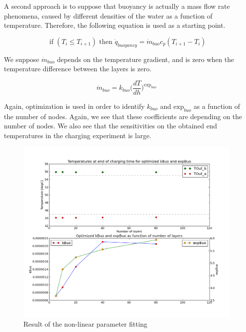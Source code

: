 A second approach is to suppose that buoyancy is actually a mass flow rate phenomena, caused by different densities of the water as a function of temperature.  Therefore, the following equation is used as a starting point.

\begin{equation}
\text{ if } (T_{i} \leq T_{i+1}) \text{ then } \dot{q}_{buoyancy} = \dot{m}_{buo} c_p (T_{i+1}-T_i)
\label{eq:}
\end{equation}

We suppose $\dot{m}_{buo}$ depends on the temperature gradient, and is zero when the temperature difference between the layers is zero.

\begin{equation}
\dot{m}_{buo} = k_{buo} {(\frac{dT}{dh}})^{\text{exp}_{buo}}
\label{eq:}
\end{equation}

Again, optimization is used in order to identify $k_{buo}$ and $\text{exp}_{buo}$ as a function of the number of nodes. Again, we see that these coefficients are depending on the number of nodes.  We also see that the sensitivities on the obtained end temperatures in the charging experiment is large.

\begin{figure}%
\begin{left}
\includegraphics[width=\columnwidth]{Thermal/images/Validation_Vitocell100V390l_ChargingTimeEndTemperatures_NonLinear.png}%
\caption{Result of the non-linear parameter fitting}%
\label{tankinternal}%
\end{left}
\end{figure}

